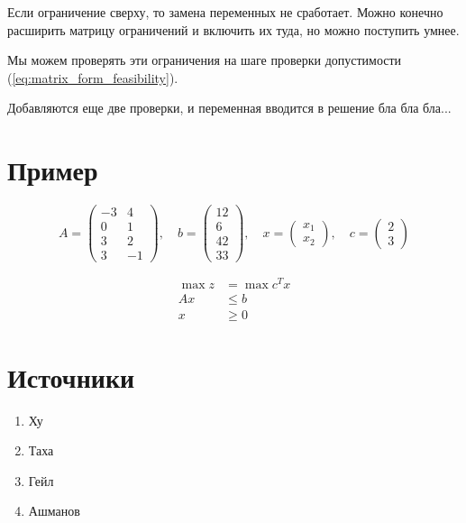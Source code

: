 \documentclass[a4paper,article,14pt]{extarticle}
\begin{document}
Если ограничение сверху, то замена переменных не сработает.
Можно конечно расширить матрицу ограничений и включить их туда, но можно поступить умнее.

Мы можем проверять эти ограничения на шаге проверки допустимости (\ref{eq:matrix_form_feasibility}).

Добавляются еще две проверки, и переменная вводится в решение бла бла бла...

\newpage

\section{Пример}

\begin{equation}
    A = \begin{pmatrix}
        -3 & 4 \\
        0 & 1 \\
        3 & 2 \\
        3 & -1
    \end{pmatrix}
    , \quad
    b =
    \begin{pmatrix}
        12 \\
        6 \\
        42 \\
        33
    \end{pmatrix}
    , \quad 
    x = \begin{pmatrix}
        x_1 \\ x_2
    \end{pmatrix}
    , \quad
    c = \begin{pmatrix}
        2 \\ 3
    \end{pmatrix}
\end{equation}

\begin{equation}
    \begin{aligned}
        \max z & = \max c^Tx \\
        Ax & \le b \\
        x & \ge 0
    \end{aligned}
\end{equation}

\newpage

\section{Источники}

\begin{enumerate}
    \item Ху
    \item Таха
    \item Гейл
    \item Ашманов
\end{enumerate}
\end{document}
